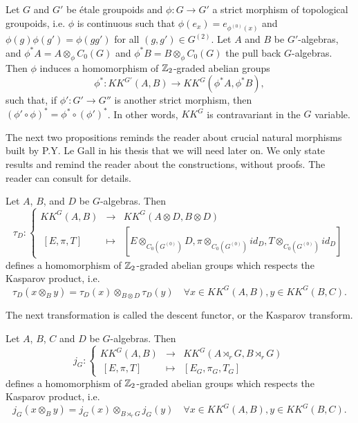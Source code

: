 \begin{prop} Let $G$ and $G'$ be étale groupoids and $\phi :G\rightarrow G'$ a strict morphism of topological groupoids, i.e. $\phi$ is continuous such that $\phi(e_x)=e_{\phi^{(0)}(x)}$ and $\phi(g)\phi(g') = \phi(gg')$ for all $(g,g')\in G^{(2)}$. Let $A$ and $B$ be $G'$-algebras, and $\phi^* A = A\otimes_\phi C_0(G)$ and $\phi^* B = B\otimes_\phi C_0(G)$ the pull back $G$-algebras. Then $\phi$ induces a homomorphism of $\mathbb Z_2$-graded abelian groups
\[\phi^* : KK^{G'}(A,B)\rightarrow KK^G(\phi^* A,\phi^* B),\]
such that, if $\phi' : G'\rightarrow G''$ is another strict morphism, then $(\phi'\circ\phi)^* =\phi^*\circ(\phi')^*$. In other words, $KK^G$ is contravariant in the $G$ variable.
\end{prop}

The next two propositions reminds the reader about crucial natural morphisms built by P.Y. Le Gall in his thesis that we will need later on. We only state results and remind the reader about the constructions, without proofs. The reader can consult \cite{LeGall} for details.

\begin{prop}\cite{LeGall} Let $A$, $B$, and $D$ be $G$-algebras. Then 
\[\tau_D : 
\left\{\begin{array}{rcl} 
KK^G(A,B) & \rightarrow & KK^G(A\otimes D,B\otimes D) \\ 
\ [E,\pi,T] & \mapsto     & [E\otimes_{C_0(G^{(0)})} D,\pi\otimes_{C_0(G^{(0)})} id_D,T\otimes_{C_0(G^{(0)})} id_D]
\end{array}\right. \] 
defines a homomorphism of $\mathbb Z_2$-graded abelian groups which respects the Kasparov product, i.e. 
\[\tau_D(x\otimes_B y) = \tau_D(x)\otimes_{B\otimes D} \tau_D(y)\quad \forall x\in KK^G(A,B),y\in KK^G(B,C).\]
\end{prop}

The next transformation is called the descent functor, or the Kasparov transform.

\begin{prop}\cite{LeGall} Let $A$, $B$, $C$ and $D$ be $G$-algebras. Then 
\[j_G : 
\left\{\begin{array}{rcl} 
KK^G(A,B) & \rightarrow & KK^G(A\rtimes_r G,B\rtimes_r G) \\ 
\ [E,\pi,T] & \mapsto     & [E_G,\pi_G,T_G]
\end{array}\right. \] 
defines a homomorphism of $\mathbb Z_2$-graded abelian groups which respects the Kasparov product, i.e. 
\[j_G(x\otimes_B y) = j_G(x)\otimes_{B\rtimes_r G} j_G(y)\quad \forall x\in KK^G(A,B),y\in KK^G(B,C).\]
\end{prop}

